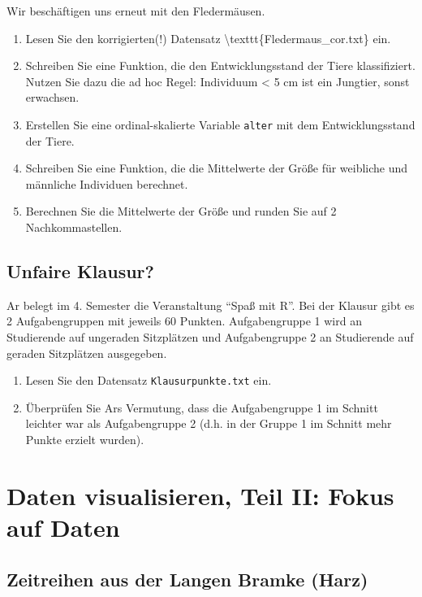 \documentclass[]{book}
\providecommand{\tightlist}{%
  \setlength{\itemsep}{0pt}\setlength{\parskip}{0pt}}
\begin{document}
Wir beschäftigen uns erneut mit den Fledermäusen.

\begin{enumerate}
\def\labelenumi{\arabic{enumi}.}
\tightlist
\item
  Lesen Sie den korrigierten(!) Datensatz \textbackslash{}texttt\{Fledermaus\_cor.txt\} ein.
\item
  Schreiben Sie eine Funktion, die den Entwicklungsstand der Tiere klassifiziert. Nutzen Sie dazu die ad hoc Regel: Individuum \textless{} 5 cm ist ein Jungtier, sonst erwachsen.
\item
  Erstellen Sie eine ordinal-skalierte Variable \texttt{alter} mit dem Entwicklungsstand der Tiere.
\item
  Schreiben Sie eine Funktion, die die Mittelwerte der Größe für weibliche und männliche Individuen berechnet.
\item
  Berechnen Sie die Mittelwerte der Größe und runden Sie auf 2 Nachkommastellen.
\end{enumerate}

\hypertarget{unfaire-klausur}{%
\subsection{Unfaire Klausur?}\label{unfaire-klausur}}

Ar belegt im 4. Semester die Veranstaltung ``Spaß mit R''. Bei der Klausur gibt es 2 Aufgabengruppen mit jeweils 60 Punkten. Aufgabengruppe 1 wird an Studierende auf ungeraden Sitzplätzen und Aufgabengruppe 2 an Studierende auf geraden Sitzplätzen ausgegeben.

\begin{enumerate}
\def\labelenumi{\arabic{enumi}.}
\tightlist
\item
  Lesen Sie den Datensatz \texttt{Klausurpunkte.txt} ein.
\item
  Überprüfen Sie Ars Vermutung, dass die Aufgabengruppe 1 im Schnitt leichter war als Aufgabengruppe 2 (d.h. in der Gruppe 1 im Schnitt mehr Punkte erzielt wurden).
\end{enumerate}

\hypertarget{daten-visualisieren-teil-ii-fokus-auf-daten}{%
\section{Daten visualisieren, Teil II: Fokus auf Daten}\label{daten-visualisieren-teil-ii-fokus-auf-daten}}

\hypertarget{zeitreihen-aus-der-langen-bramke-harz}{%
\subsection{Zeitreihen aus der Langen Bramke (Harz)}\label{zeitreihen-aus-der-langen-bramke-harz}}
\end{document}
